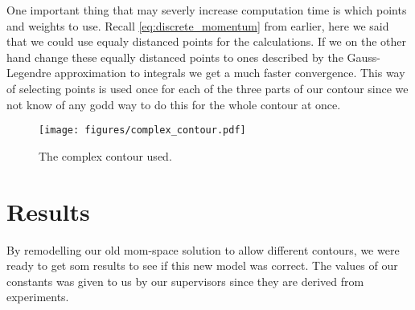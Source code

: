 One important thing that may severly increase computation time is which points and weights to use.
Recall \cref{eq:discrete_momentum} from earlier, here we said that we could use equaly distanced points for the calculations.
If we on the other hand change these equally distanced points to ones described by the Gauss-Legendre approximation to integrals we get a much faster convergence.
This way of selecting points is used once for each of the three parts of our contour since we not know of any godd way to do this for the whole contour at once.

\begin{figure}
  \centering
    \texttt{[image: figures/complex\_contour.pdf]}
  \caption{The complex contour used.}
  \label{fig:contour}
\end{figure}

\section{Results}
By remodelling our old mom-space solution to allow different contours, we were ready to get som results to see if this new model was correct. The values of our constants was given to us by our supervisors since they are derived from experiments.

